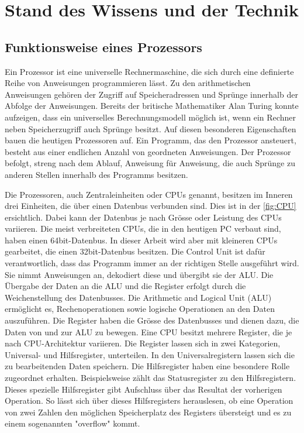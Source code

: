 \chapter{Stand des Wissens und der Technik}
\section{Funktionsweise eines Prozessors}

Ein Prozessor ist eine universelle Rechnermaschine, die sich durch eine definierte Reihe von Anweisungen programmieren lässt. Zu den arithmetischen Anweisungen gehören der Zugriff auf Speicheradressen und Sprünge innerhalb der Abfolge der Anweisungen.
Bereits der britische Mathematiker Alan Turing konnte aufzeigen, dass ein universelles Berechnungsmodell möglich ist, wenn ein Rechner neben Speicherzugriff auch Sprünge besitzt\cite{Hoffmann2014l}. Auf diesen besonderen Eigenschaften bauen die heutigen Prozessoren auf. Ein Programm, das den Prozessor ansteuert, besteht aus einer endlichen Anzahl von geordneten Anweisungen. Der Prozessor befolgt, streng nach dem Ablauf, Anweisung für Anweisung, die auch Sprünge zu anderen Stellen innerhalb des Programms besitzen.
\par
Die Prozessoren, auch Zentraleinheiten oder CPUs genannt, besitzen im Inneren drei Einheiten, die über einen Datenbus verbunden sind. Dies ist in der \autoref{fig:CPU} ersichtlich. Dabei kann der Datenbus je nach Grösse oder Leistung des CPUs variieren. Die meist verbreiteten CPUs, die in den heutigen PC verbaut sind, haben einen 64bit-Datenbus. In dieser Arbeit wird aber mit kleineren CPUs gearbeitet, die einen 32bit-Datenbus besitzen. Die Control Unit\cite{patterson2013computer} ist dafür verantwortlich, dass das Programm immer an der richtigen Stelle ausgeführt wird. Sie nimmt Anweisungen an, dekodiert diese und übergibt sie der ALU. Die Übergabe der Daten an die ALU und die Register erfolgt durch die Weichenstellung des Datenbusses. Die Arithmetic and Logical Unit (ALU) ermöglicht es, Rechenoperationen sowie logische Operationen an den Daten auszuführen. Die Register haben die Grösse des Datenbusses und dienen dazu, die Daten von und zur ALU zu bewegen. Eine CPU besitzt mehrere Register, die je nach CPU-Architektur variieren. Die Register lassen sich in zwei Kategorien, Universal- und Hilfsregister, unterteilen. In den Universalregistern lassen sich die zu bearbeitenden Daten speichern. Die Hilfsregister haben eine besondere Rolle zugeordnet erhalten. Beispielsweise zählt das Statusregister zu den Hilfsregistern. Dieses spezielle Hilfsregister gibt Aufschluss über das Resultat der vorherigen Operation. So lässt sich über dieses Hilfsregisters herauslesen, ob eine Operation von zwei Zahlen den möglichen Speicherplatz des Registers übersteigt und es zu einem sogenannten "overflow" kommt.
